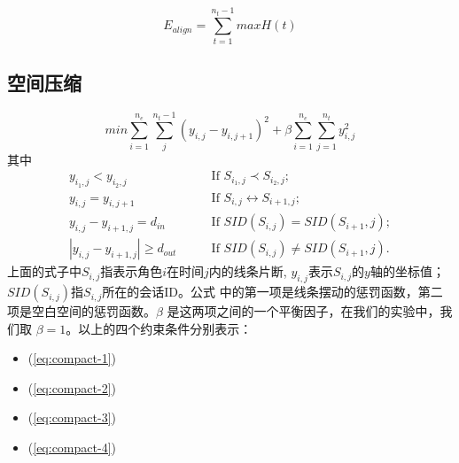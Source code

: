 \begin{equation}
E_{align} = \sum_{t=1}^{n_t-1} max H\left(t\right)
\end{equation}


\subsection{空间压缩} 
\begin{equation}
min \sum_{i=1}^{n_e} \sum_j^{n_t-1} \left(y_{i,j} - y_{i, j+1} \right)^2 + \beta \sum_{i=1}^{n_e} \sum_{j=1}^{n_t} y_{i,j}^2
\end{equation}
\label{eq:compact}
其中
\begin{subequations}
\begin{align}
	y_{i_1,j} < y_{i_2, j} & \qquad \text{If  } S_{i_1,j} \prec S_{i_2,j}; \label{eq:compact-1}\\
	y_{i,j} = y_{i,j+1} & \qquad \text{If  } S_{i,j} \leftrightarrow S_{i+1, j}; \label{eq:compact-2}\\
	y_{i,j} - y_{i+1,j} = d_{in} & \qquad \text{If  } SID(S_{i,j}) = SID(S_{i+1}, j); \label{eq:compact-3}\\
	\left|y_{i,j} - y_{i+1,j}\right| \geq d_{out} & \qquad \text{If  } SID(S_{i,j}) \neq SID(S_{i+1}, j). \label{eq:compact-4}
\end{align}
\end{subequations}
上面的式子中$S_{i,j}$指表示角色$i$在时间$j$内的线条片断, $y_{i,j}$表示$S_{i,j}$的$y$轴的坐标值；$SID(S_{i,j})$指$S_{i,j}$所在的会话ID。公式 \label{eq:compact} 中的第一项是线条摆动的惩罚函数，第二项是空白空间的惩罚函数。$\beta$ 是这两项之间的一个平衡因子，在我们的实验中，我们取 $\beta = 1$。以上的四个约束条件分别表示：
\begin{itemize}
\item (\ref{eq:compact-1}) 
\item (\ref{eq:compact-2})
\item (\ref{eq:compact-3})
\item (\ref{eq:compact-4})
\end{itemize}











